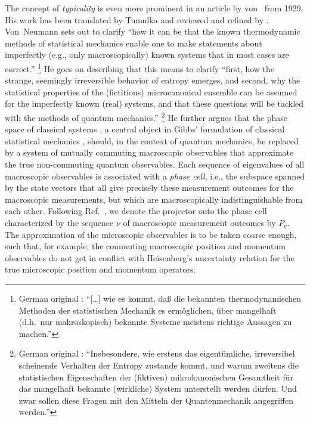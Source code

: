\documentclass[a4paper,12pt,listof=totoc,index=totoc,bibliography=totoc,headsepline=false,headings=normal,BCOR16.153846mm,DIV12,headinclude,twoside,cleardoublepage=empty,numbers=noenddot,final]{scrreprt}
\theoremstyle{mystyle}
\numberwithin{equation}{section}
\numberwithin{figure}{section}
\numberwithin{lemma}{section}
\numberwithin{theorem}{section}
\numberwithin{corollary}{section}
\numberwithin{definition}{section}
\numberwithin{conjecture}{section}
\numberwithin{observation}{section}
\newcommand{\+}{\mkern2mu}
\DeclareMathOperator{\1}{\mathds{1}}
\begin{document}
The concept of \emph{typicality} is even more prominent in an article by von~\textcite{vonneumann1929} from 1929.
His work has been translated by Tumulka \cite{Tumulka2010} and reviewed and refined by \textcite{0907.0108v1}.
Von~Neumann sets out to clarify ``how it can be that the known thermodynamic methods of statistical mechanics enable one to make statements about imperfectly (e.g., only macroscopically) known systems that in most cases are correct.''%
\footnote{German original \cite{vonneumann1929}: \foreignlanguage{ngerman}{``[\dots] wie es kommt, daß die bekannten thermodynamischen Methoden der statistischen Mechanik es ermöglichen, über mangelhaft (d.h.\ nur makroskopisch) bekannte Systeme meistens richtige Aussagen zu machen.''}}
He goes on describing that this means to clarify ``first, how the strange, seemingly irreversible behavior of entropy emerges, and second, why the statistical properties of the (fictitious) microcanonical ensemble can be assumed for the imperfectly known (real) systems, and that these questions will be tackled with the methods of quantum mechanics.''%
\footnote{German original \cite{vonneumann1929}: \foreignlanguage{ngerman}{``Insbesondere, wie erstens das eigentümliche, irreversibel scheinende Verhalten der Entropy zustande kommt, und warum zweitens die statistischen Eigenschaften der (fiktiven) mikrokanonischen Gesamtheit für das mangelhaft bekannte (wirkliche) System unterstellt werden dürfen. Und zwar sollen diese Fragen mit den Mitteln der Quantenmechanik angegriffen werden.''}}
He further argues that the phase space of classical systems \cite{Kinchin1949}, a central object in Gibbs' formulation of classical statistical mechanics \cite{Gibbs1902}, should, in the context of quantum mechanics, be replaced by a system of mutually commuting macroscopic observables that approximate the true non-commuting quantum observables.
Each sequence of eigenvalues of all macroscopic observables is associated with a \emph{phase cell}, i.e., the subspace spanned by the state vectors that all give precisely these measurement outcomes for the macroscopic measurements, but which are macroscopically indistinguishable from each other.
Following Ref.~\cite{0907.0108v1}, we denote the projector onto the phase cell characterized by the sequence $\nu$ of macroscopic measurement outcomes by $P_\nu$.
The approximation of the microscopic observables is to be taken coarse enough, such that, for example, the commuting macroscopic position and momentum observables do not get in conflict with Heisenberg's uncertainty relation for the true microscopic position and momentum operators.
\end{document}

